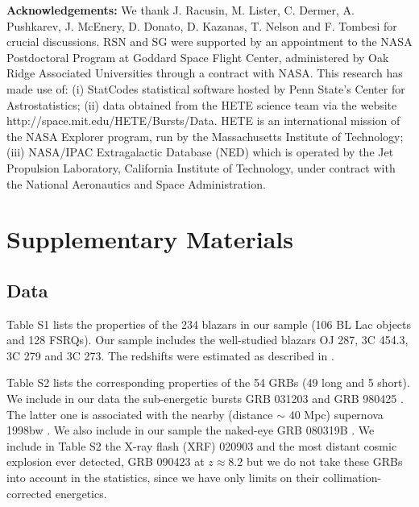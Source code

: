 \documentclass[12pt]{article}
\begin{document}
\begin{thebibliography}{1}
{\bf Acknowledgements:} We thank J. Racusin, M. Lister, C. Dermer, A. Pushkarev, J. McEnery, D. Donato, D. Kazanas, T. Nelson and F. Tombesi for crucial discussions. RSN and SG were supported by an appointment to the NASA Postdoctoral Program at Goddard Space Flight Center, administered by Oak Ridge Associated Universities through a contract with NASA.
This research has made use of: 
(i) StatCodes statistical software hosted by Penn State's Center for Astrostatistics;
(ii) data obtained from the HETE science team via the website http://space.mit.edu/HETE/Bursts/Data. HETE is an international mission of the NASA Explorer program, run by the Massachusetts Institute of Technology;
(iii) NASA/IPAC Extragalactic Database (NED) which is operated by the Jet Propulsion Laboratory, California Institute of Technology, under contract with the National Aeronautics and Space Administration.
\end{thebibliography}





\clearpage
\setcounter{page}{1}












\section*{Supplementary Materials}

\subsection*{Data}

Table S1 lists the properties of the 234 blazars in our sample (106 BL Lac objects and 128 FSRQs). Our sample includes the well-studied blazars OJ 287, 3C 454.3, 3C 279 and 3C 273. The redshifts were estimated as described in \cite{smeyer11}.

Table S2 lists the corresponding properties of the 54 GRBs (49 long and 5 short). 
We include in our data the sub-energetic bursts GRB 031203 \cite{ssode04} and GRB 980425 \cite{spain00}. The latter one is associated with the nearby (distance $\sim$ 40 Mpc) supernova 1998bw \cite{sgalama98, skulkarni98}. We also include in our sample the naked-eye GRB 080319B \cite{sracusin08}. We include in Table S2 the X-ray flash (XRF) 020903 \cite{ssode04apj} and the most distant cosmic explosion ever detected, GRB 090423 at $z \approx 8.2$ \cite{stanvir09,schandra10} but we do not take these GRBs into account in the statistics, since we have only limits on their collimation-corrected energetics.
\end{document}
